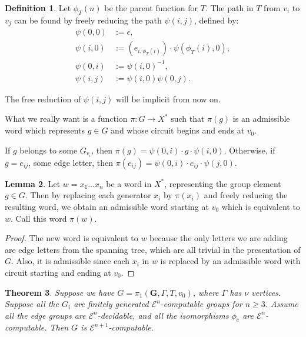 \documentclass[a4paper]{article}
\newcommand{\grz}[1]{$\mathcal{E}^{#1}$}	%
\newcommand{\fgoagog}{\pi_1(\mathbf{G},\Gamma,T,v_0)}	%
\theoremstyle{plain}
\newtheorem{theorem}{Theorem}[section]
\theoremstyle{definition}
\newtheorem{lemma}[theorem]{Lemma}
\newtheorem{definition}[theorem]{Definition}
\begin{document}
\begin{definition}
Let $\phi_T(n)$ be the parent function for $T$. The path in $T$ from $v_i$ to $v_j$ can be found by freely reducing the path $\psi(i,j)$, defined by:
\begin{equation}\begin{split}
\psi(0,0) &:= \epsilon, \\
\psi(i,0) &:= (e_{i,\phi_T(i)}) \cdot \psi(\phi_T(i),0), \\
\psi(0,i) &:= \psi(i,0)^{-1}, \\
\psi(i,j) &:= \psi(i,0) \psi(0,j).
\end{split}\end{equation}

The free reduction of $\psi(i,j)$ will be implicit from now on.

What we really want is a function $\pi:G \rightarrow X^{\ast}$ such that $\pi(g)$ is an admissible word which represents $g \in G$ and whose circuit begins and ends at $v_0$.

If $g$ belongs to some $G_{v_i}$, then $\pi(g) = \psi(0,i) \cdot g \cdot \psi(i,0)$. Otherwise, if $g = e_{ij}$, some edge letter, then $\pi(e_{ij}) = \psi(0,i) \cdot e_{ij} \cdot \psi(j,0)$.
\end{definition}

\begin{lemma}
	Let $w = x_1 \dots x_n$ be a word in $X^{\ast}$, representing the group element $g \in G$. Then by replacing each generator $x_i$ by $\pi(x_i)$ and freely reducing the resulting word, we obtain an admissible word starting at $v_0$ which is equivalent to $w$. Call this word $\pi(w)$.
\end{lemma}

\begin{proof}
The new word is equivalent to $w$ because the only letters we are adding are edge letters from the spanning tree, which are all trivial in the presentation of $G$. Also, it is admissible since each $x_i$ in $w$ is replaced by an admissible word with circuit starting and ending at $v_0$.
\end{proof}

\begin{theorem} \label{thm:fgoagogcomp}
Suppose we have $G = \fgoagog$, where $\Gamma$ has $\nu$ vertices. Suppose 
all the $G_i$ are finitely generated \grz{n}-computable groups for $n \geq 3$. Assume all the edge groups are \grz{n}-decidable, and all the isomorphisms $\phi_e$ are \grz{n}-computable. Then $G$ is \grz{n+1}-computable.
\end{theorem}
\end{document}
